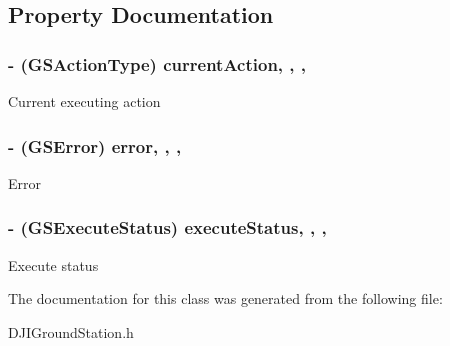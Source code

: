 \subsection{Property Documentation}
\hypertarget{interface_ground_station_execute_result_aed74c158994195c5f0ac2bdb0577b02e}{
\subsubsection[{current\+Action}]{\setlength{\rightskip}{0pt plus 5cm}-\/ (G\+S\+Action\+Type) current\+Action\hspace{0.3cm}{\ttfamily [read]}, {\ttfamily [write]}, {\ttfamily [nonatomic]}, {\ttfamily [assign]}}}\label{interface_ground_station_execute_result_aed74c158994195c5f0ac2bdb0577b02e}
Current executing action \hypertarget{interface_ground_station_execute_result_a3bf529c213113e8f28264e9d50228425}{
\subsubsection[{error}]{\setlength{\rightskip}{0pt plus 5cm}-\/ (G\+S\+Error) error\hspace{0.3cm}{\ttfamily [read]}, {\ttfamily [write]}, {\ttfamily [nonatomic]}, {\ttfamily [assign]}}}\label{interface_ground_station_execute_result_a3bf529c213113e8f28264e9d50228425}
Error \hypertarget{interface_ground_station_execute_result_ab3cb1e15e2841548938ce23f1bacc612}{
\subsubsection[{execute\+Status}]{\setlength{\rightskip}{0pt plus 5cm}-\/ (G\+S\+Execute\+Status) execute\+Status\hspace{0.3cm}{\ttfamily [read]}, {\ttfamily [write]}, {\ttfamily [nonatomic]}, {\ttfamily [assign]}}}\label{interface_ground_station_execute_result_ab3cb1e15e2841548938ce23f1bacc612}
Execute status 

The documentation for this class was generated from the following file\+:\begin{DoxyCompactItemize}
\item 
D\+J\+I\+Ground\+Station.\+h\end{DoxyCompactItemize}
